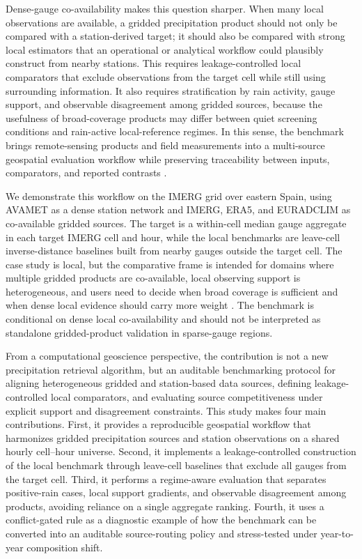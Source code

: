 \documentclass[preprint,12pt]{elsarticle}
\begin{document}
Dense-gauge co-availability makes this question sharper. When many local observations are available, a gridded precipitation product should not only be compared with a station-derived target; it should also be compared with strong local estimators that an operational or analytical workflow could plausibly construct from nearby stations. This requires leakage-controlled local comparators that exclude observations from the target cell while still using surrounding information. It also requires stratification by rain activity, gauge support, and observable disagreement among gridded sources, because the usefulness of broad-coverage products may differ between quiet screening conditions and rain-active local-reference regimes. In this sense, the benchmark brings remote-sensing products and field measurements into a multi-source geospatial evaluation workflow while preserving traceability between inputs, comparators, and reported contrasts \citep{pohl1998datafusion}.

We demonstrate this workflow on the IMERG grid over eastern Spain, using AVAMET as a dense station network and IMERG, ERA5, and EURADCLIM as co-available gridded sources. The target is a within-cell median gauge aggregate in each target IMERG cell and hour, while the local benchmarks are leave-cell inverse-distance baselines built from nearby gauges outside the target cell. The case study is local, but the comparative frame is intended for domains where multiple gridded products are co-available, local observing support is heterogeneous, and users need to decide when broad coverage is sufficient and when dense local evidence should carry more weight \citep{lombardi2024tanaro}. The benchmark is conditional on dense local co-availability and should not be interpreted as standalone gridded-product validation in sparse-gauge regions.

From a computational geoscience perspective, the contribution is not a new precipitation retrieval algorithm, but an auditable benchmarking protocol for aligning heterogeneous gridded and station-based data sources, defining leakage-controlled local comparators, and evaluating source competitiveness under explicit support and disagreement constraints. This study makes four main contributions. First, it provides a reproducible geospatial workflow that harmonizes gridded precipitation sources and station observations on a shared hourly cell--hour universe. Second, it implements a leakage-controlled construction of the local benchmark through leave-cell baselines that exclude all gauges from the target cell. Third, it performs a regime-aware evaluation that separates positive-rain cases, local support gradients, and observable disagreement among products, avoiding reliance on a single aggregate ranking. Fourth, it uses a conflict-gated rule as a diagnostic example of how the benchmark can be converted into an auditable source-routing policy and stress-tested under year-to-year composition shift.
\end{document}
